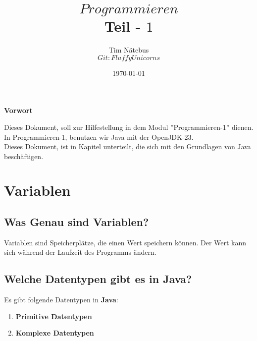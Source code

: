 \documentclass[12pt, a4paper]{article}
\title{
    $Programmieren$\\
    Teil - $1$
    }
\author{
    {Tim Nätebus} \\
    {$Git: FluffyUnicorns$}
}
\date{\today}
\begin{document}
\maketitle
\begin{titlepage}
    \vspace*{\fill}
    \begin{center}
        \Huge
        \textbf{Vorwort}
    \end{center}
    \vspace{1cm}
    \begin{center}
        \large
        Dieses Dokument, soll zur Hilfestellung in dem Modul ''Programmieren-1'' dienen. \\
        \vspace{1cm}
        In Programmieren-1, benutzen wir Java mit der OpenJDK-23. \\
        \vspace{1cm}
        Dieses Dokument, ist in Kapitel unterteilt, die sich mit den Grundlagen von Java beschäftigen. 
    \end{center}
    \vspace*{\fill}
\end{titlepage}
\newpage
\tableofcontents
\newpage
\section*{Variablen}
\subsection*{Was Genau sind Variablen?}
Variablen sind Speicherplätze, die einen Wert speichern können. Der Wert kann sich während der Laufzeit des Programms ändern.
\subsection*{Welche Datentypen gibt es in Java?}
Es gibt folgende Datentypen in \textbf{Java}:
\begin{enumerate}[label=-]
    \item \textbf{Primitive Datentypen}
    \item \textbf{Komplexe Datentypen}
\end{enumerate}
\end{document}
